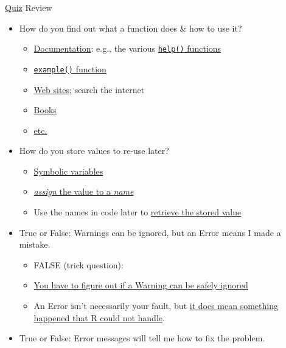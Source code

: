 \documentclass[
  11pt,
  ignorenonframetext,
]{beamer}
\providecommand{\tightlist}{%
  \setlength{\itemsep}{0pt}\setlength{\parskip}{0pt}}
\begin{document}
\begin{frame}[fragile]{\protect\hyperlink{pop-quiz}{Quiz} Review}
{\begin{itemize}
  \begin{itemize}
  \tightlist
  \item
    By entering commands in the
    \href{interacting-with-R-command-line}{command-line}, and reading
    messages and output from the \emph{console}.
  \end{itemize}
\item
  How do you find out what a function does \& how to use it?

  \begin{itemize}
  \tightlist
  \item
    \protect\hyperlink{textttr-documentation}{Documentation}: e.g., the
    various
    \protect\hyperlink{textttr-documentation-find-it}{\texttt{help()}
    functions}
  \item
    \protect\hyperlink{R-documentation-read-it-end}{\texttt{example()}
    function}
  \item
    \protect\hyperlink{help-web-sites}{Web sites}; search the internet
  \item
    \protect\hyperlink{help-books}{Books}
  \item
    \protect\hyperlink{help-documentation}{etc.}
  \end{itemize}
\item
  How do you store values to re-use later?

  \begin{itemize}
  \tightlist
  \item
    \protect\hyperlink{symbolic-variables}{Symbolic variables}
  \item
    \protect\hyperlink{symbolic-variables}{\emph{assign} the value to a
    \emph{name}}
  \item
    Use the names in code later to
    \protect\hyperlink{retrieve-values}{retrieve the stored value}
  \end{itemize}
\item
  True or False: Warnings can be ignored, but an Error means I made a
  mistake.

  \begin{itemize}
  \tightlist
  \item
    FALSE (trick question):
  \item
    \protect\hyperlink{warnings}{You have to figure out if a Warning can
    be safely ignored}
  \item
    An Error isn't necessarily your fault, but
    \protect\hyperlink{errors}{it does mean something happened that R
    could not handle}.
  \end{itemize}
\item
  True or False: Error messages will tell me how to fix the problem.


\end{itemize}}
\end{frame}
\end{document}
